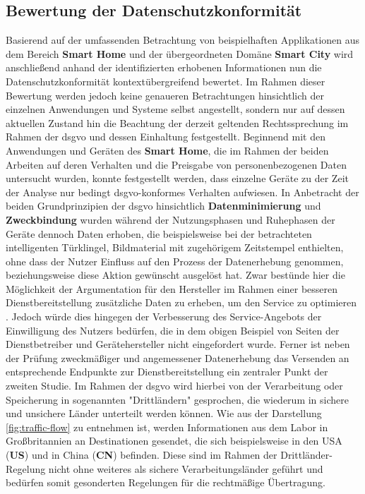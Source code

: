 \subsection{Bewertung der Datenschutzkonformität}
\label{sec:Analyse der Datenerhebung:ssec:Bewertung der Datenschutzkonformität}
Basierend auf der umfassenden Betrachtung von beispielhaften Applikationen aus dem Bereich \textbf{Smart Home} und der übergeordneten Domäne \textbf{Smart City} wird anschließend anhand der identifizierten erhobenen Informationen nun die Datenschutzkonformität kontextübergreifend bewertet. 
Im Rahmen dieser Bewertung werden jedoch keine genaueren Betrachtungen hinsichtlich der einzelnen Anwendungen und Systeme selbst angestellt, sondern nur auf dessen aktuellen Zustand hin die Beachtung der derzeit geltenden Rechtssprechung im Rahmen der \ac{dsgvo} und dessen Einhaltung festgestellt.
Beginnend mit den Anwendungen und Geräten des \textbf{Smart Home}, die im Rahmen der beiden Arbeiten \cite{Mandalari2021,Ren2019} auf deren Verhalten und die Preisgabe von personenbezogenen Daten untersucht wurden, konnte festgestellt werden, dass einzelne Geräte zu der Zeit der Analyse nur bedingt \ac{dsgvo}-konformes Verhalten aufwiesen. 
In Anbetracht der beiden Grundprinzipien der \ac{dsgvo} hinsichtlich \textbf{Datenminimierung} und \textbf{Zweckbindung} wurden während der Nutzungsphasen und Ruhephasen der Geräte dennoch Daten erhoben, die beispielsweise bei der betrachteten intelligenten Türklingel, Bildmaterial mit zugehörigem Zeitstempel enthielten, ohne dass der Nutzer Einfluss auf den Prozess der Datenerhebung genommen, beziehungsweise diese Aktion gewünscht ausgelöst hat. 
Zwar bestünde hier die Möglichkeit der Argumentation für den Hersteller im Rahmen einer besseren Dienstbereitstellung zusätzliche Daten zu erheben, um den Service zu optimieren \cite{Bastos2019}. Jedoch würde dies hingegen der Verbesserung des Service-Angebots der Einwilligung des Nutzers bedürfen, die in dem obigen Beispiel von Seiten der Dienstbetreiber und Gerätehersteller nicht eingefordert wurde. 
Ferner ist neben der Prüfung zweckmäßiger und angemessener Datenerhebung das Versenden an entsprechende Endpunkte zur Dienstbereitstellung ein zentraler Punkt der zweiten Studie. Im Rahmen der \ac{dsgvo} wird hierbei von der Verarbeitung oder Speicherung in sogenannten "Drittländern" \cite{Dsgvo2016} gesprochen, die wiederum in sichere und unsichere Länder unterteilt werden können. 
Wie aus der Darstellung \ref{fig:traffic-flow} zu entnehmen ist, werden Informationen aus dem Labor in Großbritannien an Destinationen gesendet, die sich beispielsweise in den USA (\textbf{US}) und in China (\textbf{CN}) befinden. Diese sind im Rahmen der Drittländer-Regelung nicht ohne weiteres als sichere Verarbeitungsländer geführt und bedürfen somit gesonderten Regelungen für die rechtmäßige Übertragung. 
